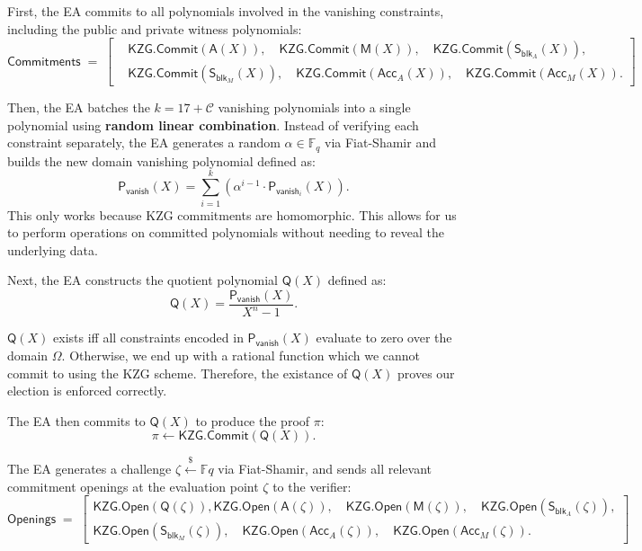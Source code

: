 First, the EA commits to all polynomials involved in the vanishing constraints, including the public and private witness polynomials:
\[
\mathsf{Commitments} \;=\;
\left[
\begin{aligned}
&\mathsf{KZG.Commit}(\mathsf{A}(X)),\quad
 \mathsf{KZG.Commit}(\mathsf{M}(X)),\quad
 \mathsf{KZG.Commit}(\mathsf{S}_{\mathsf{blk}_A}(X)),\\
&\mathsf{KZG.Commit}(\mathsf{S}_{\mathsf{blk}_M}(X)),\quad
 \mathsf{KZG.Commit}(\mathsf{Acc}_A(X)),\quad
 \mathsf{KZG.Commit}(\mathsf{Acc}_M(X)).
\end{aligned}
\right]
\]


Then, the EA batches the $k=17+\mathcal{C}$ vanishing polynomials into a single polynomial using \textbf{random linear combination}. Instead of verifying each constraint separately, the EA generates a random $\alpha\in\mathbb{F}_q$ via Fiat-Shamir and builds the new domain vanishing polynomial defined as:
\begin{equation}
\label{eq:vanish}
\mathsf{P_{vanish}}(X)= \sum_{i=1}^{k}(\alpha^{i-1}\cdot \mathsf{P}_{\mathsf{vanish}_i}(X)).
\end{equation}
This only works because KZG commitments are homomorphic. This allows for us to perform 
operations on committed polynomials without needing to reveal the underlying data. 

Next, the EA constructs the quotient polynomial $\mathsf{Q}(X)$ defined as:
\begin{equation}
\label{eq:q1}
\mathsf{Q}(X) = \frac{\mathsf{P_{vanish}}(X)}{X^{n} - 1}.
\end{equation}

$\mathsf{Q}(X)$ exists iff all constraints encoded in $\mathsf{P_{vanish}}(X)$ evaluate to zero over the domain $\Omega$.
Otherwise, we end up with a rational function which we cannot commit to using the KZG scheme. Therefore, the existance of $\mathsf{Q}(X)$ proves our election is enforced correctly.

The EA then commits to $\mathsf{Q}(X)$ to produce the proof $\pi$:
\[
\pi \leftarrow \mathsf{KZG.Commit}(\mathsf{Q}(X)).
\]

The EA generates a challenge $\zeta\stackrel{\$}{\leftarrow}\mathbb{F}q$ via Fiat-Shamir, and sends all relevant commitment openings at the evaluation point $\zeta$ to the verifier:
\[
\mathsf{Openings} \;=\;
\left[
\begin{aligned}
\mathsf{KZG.Open}(\mathsf{Q}(\zeta)),
\mathsf{KZG.Open}(\mathsf{A}(\zeta)),\quad 
\mathsf{KZG.Open}(\mathsf{M}(\zeta)),\quad
\mathsf{KZG.Open}(\mathsf{S}_{\mathsf{blk}_A}(\zeta)),\\
\mathsf{KZG.Open}(\mathsf{S}_{\mathsf{blk}_M}(\zeta)),\quad
\mathsf{KZG.Open}(\mathsf{Acc}_A(\zeta)),\quad
\mathsf{KZG.Open}(\mathsf{Acc}_M(\zeta)).
\end{aligned}
\right]
\]


